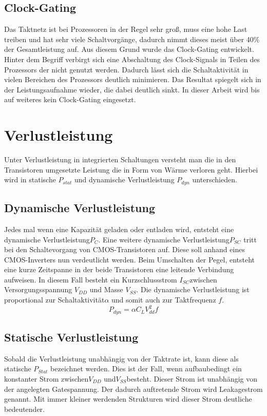\subsection{Clock-Gating}\label{subsec:clock-gate}
Das Taktnetz ist bei Prozessoren in der Regel sehr groß, muss eine hohe Last treiben und hat sehr viele Schaltvorgänge, dadurch nimmt dieses meist über 40\% der Gesamtleistung auf. Aus diesem Grund wurde das Clock-Gating entwickelt. Hinter dem Begriff verbirgt sich eine Abschaltung des Clock-Signals in Teilen des Prozessors der nicht genutzt werden. Dadurch lässt sich die Schaltaktivität in vielen Bereichen des Prozessors deutlich minimieren. Das Resultat spiegelt sich in der Leistungsaufnahme wieder, die dabei deutlich sinkt.\cite{donno2003clock} In dieser Arbeit wird bis auf weiteres kein Clock-Gating eingesetzt.

\section{Verlustleistung}
\label{sec:verlustleistung}
Unter Verlustleistung in integrierten Schaltungen versteht man die in den Transistoren umgesetzte Leistung die in Form von Wärme verloren geht.
Hierbei wird in statische \(P_{stat}\) und dynamische Verlustleistung \(P_{dyn}\) unterschieden. \cite[Seite 4 ff.]{flynn2007low}
\subsection{Dynamische Verlustleistung}\label{subsec:dynVerl}
Jedes mal wenn eine Kapazität geladen oder entladen wird, entsteht eine dynamische Verlustleistung\(P_C\). Eine weitere dynamische Verlustleistung\(P_{SC}\) tritt bei den Schaltevorgang von CMOS-Transistoren auf. Diese soll anhand eines CMOS-Inverters nun verdeutlicht werden. Beim Umschalten der Pegel, entsteht eine kurze Zeitspanne in der beide Transistoren eine leitende Verbindung aufweisen. In diesem Fall besteht ein Kurzschlussstrom \(I_{SC}\)zwischen Versorgungsspannung \(V_{DD}\) und Masse \(V_{SS}\). Die dynamische Verlustleistung ist proportional zur Schaltaktivität\(\alpha\) und somit auch zur Taktfrequenz $f$.\cite[Seite 4 ff.]{flynn2007low}
\begin{equation}
P_{dyn} = \alpha  C_L  V_{dd}^{2}  f
\label{eq:dynVerlustleistung}
\end{equation}
\subsection{Statische Verlustleistung}\label{subsec:statVerl}
Sobald die Verlustleistung unabhängig von der Taktrate ist, kann diese als statische \(P_{Stat}\) bezeichnet werden. Dies ist der Fall, wenn aufbaubedingt ein konstanter Strom zwischen\(V_{DD}\) und\(V_{SS}\)besteht. Dieser Strom ist unabhängig von der angelegten Gatespannung. Der dadurch auftretende Strom wird Leakagestrom genannt. Mit immer kleiner werdenden Strukturen wird dieser Strom deutliche bedeutender.\cite[Seite 8]{flynn2007low}

